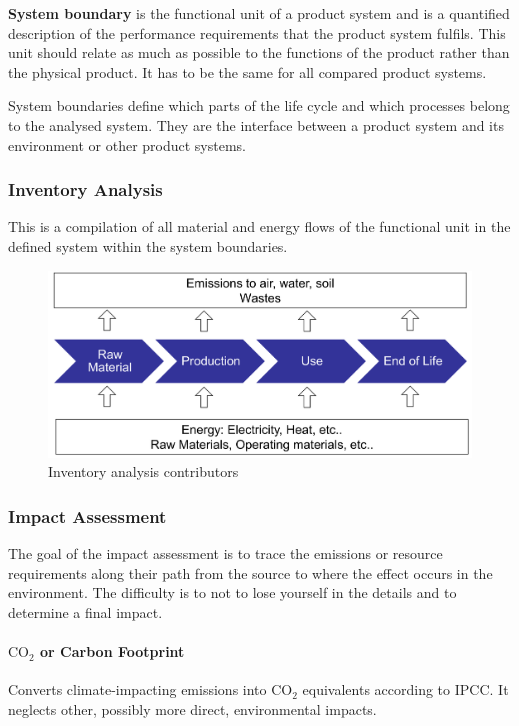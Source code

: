 \documentclass[11pt]{article}
\theoremstyle{definition}
\begin{document}
\begin{definition}
	\textbf{System boundary} is the functional unit of a product system and is a quantified description of the performance requirements that the product system fulfils. This unit should relate as much as possible to the functions of the product rather than the physical product. It has to be the same for all compared product systems.
\end{definition}

System boundaries define which parts of the life cycle and which processes belong to the analysed system. They are the interface between a product system and its environment or other product systems.

\subsubsection{Inventory Analysis}
This is a compilation of all material and energy flows of the functional unit in the defined system within the system boundaries.
\begin{figure}[H]
	\centering
	\includegraphics[width=0.8\linewidth]{img/inventory_analysis}
	\caption{Inventory analysis contributors}
	\label{fig:inventoryanalysis}
\end{figure}

\subsubsection{Impact Assessment}
The goal of the impact assessment is to trace the emissions or resource requirements along their path from the source to where the effect occurs in the environment. The difficulty is to not to lose yourself in the details and to determine a final impact.

\paragraph{$\text{CO}_2$ or Carbon Footprint} Converts climate-impacting emissions into $\text{CO}_2$ equivalents according to IPCC. It neglects other, possibly more direct, environmental impacts.
\end{document}
